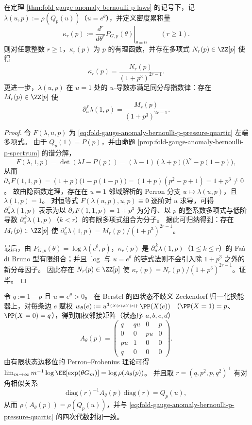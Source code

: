 

\begin{proposition}[全阶密度累积量的有理性与分母指数律]\label{prop:fold-gauge-anomaly-bernoulli-p-cumulant-denominator-law}
在定理 \ref{thm:fold-gauge-anomaly-bernoulli-p-laws} 的记号下，记 \(\lambda(u,p):=\rho(Q_p(u))\)（\(u=e^\theta\)），并定义密度累积量
\[
\kappa_r(p):=\left.\frac{d^r}{d\theta^r}P_{G,p}(\theta)\right|_{\theta=0}\qquad(r\ge 1).
\]
则对任意整数 \(r\ge 1\)，\(\kappa_r(p)\) 为 \(p\) 的有理函数，并存在多项式 \(N_r(p)\in\ZZ[p]\) 使得
\[
\boxed{\;\kappa_r(p)=\frac{N_r(p)}{(1+p^3)^{2r-1}}.\;}
\]
更进一步，\(\lambda(u,p)\) 在 \(u=1\) 处的 \(u\)-导数亦满足同分母指数律：存在 \(M_r(p)\in\ZZ[p]\) 使
\[
\boxed{\;\partial_u^{\,r}\lambda(1,p)=\frac{M_r(p)}{(1+p^3)^{2r-1}}.\;}
\]
\end{proposition}
\begin{proof}
令 \(F(\lambda,u,p)\) 为 \eqref{eq:fold-gauge-anomaly-bernoulli-p-pressure-quartic} 左端多项式。
由于 \(Q_p(1)=P(p)\)，并由命题 \ref{prop:fold-gauge-anomaly-bernoulli-p-spectrum} 的谱分解，
\[
F(\lambda,1,p)=\det(\lambda I-P(p))=(\lambda-1)(\lambda+p)\bigl(\lambda^2-p(1-p)\bigr),
\]
从而
\(
\partial_\lambda F(1,1,p)=(1+p)\bigl(1-p(1-p)\bigr)=(1+p)(p^2-p+1)=1+p^3\neq 0
\)。
故由隐函数定理，存在在 \(u=1\) 邻域解析的 Perron 分支 \(u\mapsto \lambda(u,p)\)，且 \(\lambda(1,p)=1\)。
对恒等式 \(F(\lambda(u,p),u,p)\equiv 0\) 逐阶对 \(u\) 求导，可得 \(\partial_u^{\,r}\lambda(1,p)\) 表示为以 \(\partial_\lambda F(1,1,p)=1+p^3\) 为分母、以 \(p\) 的整系数多项式与低阶导数 \(\partial_u^{\,k}\lambda(1,p)\)（\(k<r\)）的有限多项式组合为分子。
据此可归纳得到：存在 \(M_r(p)\in\ZZ[p]\) 使 \(\partial_u^{\,r}\lambda(1,p)=M_r(p)/(1+p^3)^{2r-1}\)。
\par
最后，由 \(P_{G,p}(\theta)=\log\lambda(e^\theta,p)\)，\(\kappa_r(p)\) 是 \(\partial_u^{\,k}\lambda(1,p)\)（\(1\le k\le r\)）的 Fa\`a di Bruno 型有限组合；并且 \(\log\) 与 \(u=e^\theta\) 的链式法则不会引入除 \(1+p^3\) 之外的新分母因子。
因此存在 \(N_r(p)\in\ZZ[p]\) 使 \(\kappa_r(p)=N_r(p)/(1+p^3)^{2r-1}\)。证毕。
\end{proof}
\begin{remark}\label{rem:fold-gauge-anomaly-bernoulli-p-adjacency-parry}
令 \(q:=1-p\) 且 \(u=e^\theta>0\)。
在 Berstel 的四状态不歧义 Zeckendorf 归一化换能器上，对每条边 \(e\) 赋权
\(
w_\theta(e):=u^{\mathbf 1_{\{X(e)\neq Y(e)\}}}\,\PP(X(e))
\)
（\(\PP(X=1)=p\)、\(\PP(X=0)=q\)），得到加权邻接矩阵（状态序 \(a,b,c,d\)）
\[
A_\theta(p)=
\begin{pmatrix}
q & q u & 0 & p\\
0 & 0 & p u & 0\\
p u & 1 & 0 & 0\\
q & 0 & 0 & 0
\end{pmatrix}.
\]
由有限状态边移位的 Perron--Frobenius 理论可得
\(
\lim_{m\to\infty}m^{-1}\log \EE[\exp(\theta G_m)]=\log\rho(A_\theta(p))
\)。
并且取 \(r=(q,p^2,p,q^2)^{\top}\) 有对角相似关系
\[
\mathrm{diag}(r)^{-1}A_\theta(p)\,\mathrm{diag}(r)=Q_p(u),
\]
从而 \(\rho(A_\theta(p))=\rho(Q_p(u))\)，并与 \eqref{eq:fold-gauge-anomaly-bernoulli-p-pressure-quartic} 的四次代数封闭一致。
\end{remark}
